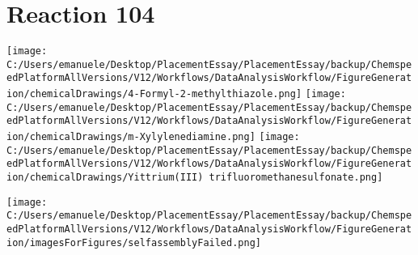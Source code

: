 \documentclass{article}%
\begin{document}
\section*{Reaction 104}%
%
\begin{scheme}[H]%
\begin{minipage}{0.5\textwidth}%
\texttt{[image: C:/Users/emanuele/Desktop/PlacementEssay/PlacementEssay/backup/ChemspeedPlatformAllVersions/V12/Workflows/DataAnalysisWorkflow/FigureGeneration/chemicalDrawings/4-Formyl-2-methylthiazole.png]}%
\texttt{[image: C:/Users/emanuele/Desktop/PlacementEssay/PlacementEssay/backup/ChemspeedPlatformAllVersions/V12/Workflows/DataAnalysisWorkflow/FigureGeneration/chemicalDrawings/m-Xylylenediamine.png]}%
\texttt{[image: C:/Users/emanuele/Desktop/PlacementEssay/PlacementEssay/backup/ChemspeedPlatformAllVersions/V12/Workflows/DataAnalysisWorkflow/FigureGeneration/chemicalDrawings/Yittrium(III) trifluoromethanesulfonate.png]}%
\end{minipage}%
\begin{minipage}{0.5\textwidth}%
\begin{center}%
\texttt{[image: C:/Users/emanuele/Desktop/PlacementEssay/PlacementEssay/backup/ChemspeedPlatformAllVersions/V12/Workflows/DataAnalysisWorkflow/FigureGeneration/imagesForFigures/selfassemblyFailed.png]}%
\end{center}%
\end{minipage}%
\caption{Self-assembly of components 1, 18, with Yittrium(III) in a 3.0:1.5:1.0 molar ratio in CH$_3$CN at 60\textdegree C for 40h. These are the reagents (starting materials) for reaction 104.}%
\end{scheme}%
\end{document}
